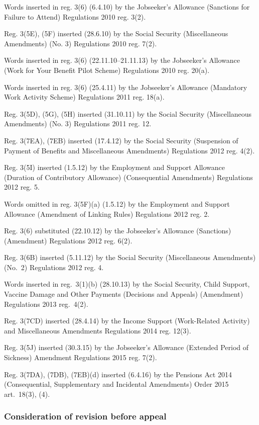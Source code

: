\documentclass[12pt,a4paper]{article}
\begin{document}
{Words inserted in reg. 3(6) (6.4.10) by the Jobseeker’s Allowance (Sanctions for Failure to Attend) Regulations 2010 reg. 3(2).

Reg. 3(5E), (5F) inserted (28.6.10) by the Social Security (Miscellaneous Amendments) (No. 3) Regulations 2010 reg. 7(2).

Words inserted in reg. 3(6) (22.11.10--21.11.13) by the Jobseeker’s Allowance (Work for Your Benefit Pilot Scheme) Regulations 2010 reg. 20(a).

Words inserted in reg. 3(6) (25.4.11) by the Jobseeker’s Allowance (Mandatory Work Activity Scheme) Regulations 2011 reg. 18(a).

Reg. 3(5D), (5G), (5H) inserted (31.10.11) by the Social Security (Miscellaneous Amendments) (No. 3) Regulations 2011 reg. 12.

Reg. 3(7EA), (7EB) inserted (17.4.12) by the Social Security (Suspension of Payment of Benefits and Miscellaneous Amendments) Regulations 2012 reg. 4(2).

Reg. 3(5I) inserted (1.5.12) by the Employment and Support Allowance (Duration of Contributory Allowance) (Consequential Amendments) Regulations 2012 reg. 5.

Words omitted in reg. 3(5F)(a) (1.5.12) by the Employment and Support Allowance (Amendment of Linking Rules) Regulations 2012 reg. 2.

Reg. 3(6) substituted (22.10.12) by the Jobseeker’s Allowance (Sanctions) (Amendment) Regulations 2012 reg. 6(2).

Reg. 3(6B) inserted (5.11.12) by the Social Security (Miscellaneous Amendments) (No.~2) Regulations 2012 reg. 4.

Words inserted in reg.~3(1)(b) (28.10.13) by the Social Security, Child Support, Vaccine Damage and Other Payments (Decisions and Appeals) (Amendment) Regulations 2013 reg.~4(2).

Reg. 3(7CD) inserted (28.4.14) by the Income Support (Work-Related Activity) and Miscellaneous Amendments Regulations 2014 reg. 12(3).

Reg. 3(5J) inserted (30.3.15) by the Jobseeker’s Allowance (Extended Period of Sickness) Amendment Regulations 2015 reg. 7(2).

Reg. 3(7DA), (7DB), (7EB)(d) inserted (6.4.16) by the Pensions Act 2014 (Consequential, Supplementary and Incidental Amendments) Order 2015 art.~18(3), (4).
}

\subsubsection[3ZA. Consideration of revision before appeal]{Consideration of revision before appeal}
\end{document}
